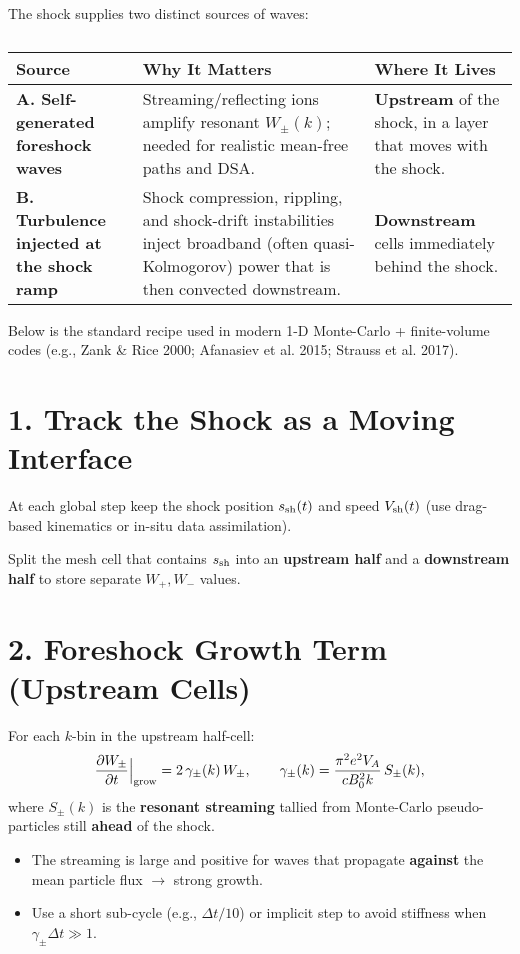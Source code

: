 The shock supplies two distinct sources of waves:

\begin{table}[h!]
\centering
\begin{tabular}{|p{5cm}|p{6.5cm}|p{4.5cm}|}
\hline
\textbf{Source} & \textbf{Why It Matters} & \textbf{Where It Lives} \\
\hline
\textbf{A. Self-generated foreshock waves} & Streaming/reflecting ions amplify resonant $W_\pm(k)$; needed for realistic mean-free paths and DSA. & \textbf{Upstream} of the shock, in a layer that moves with the shock. \\
\hline
\textbf{B. Turbulence injected at the shock ramp} & Shock compression, rippling, and shock-drift instabilities inject broadband (often quasi-Kolmogorov) power that is then convected downstream. & \textbf{Downstream} cells immediately behind the shock. \\
\hline
\end{tabular}
\caption*{}
\end{table}

\noindent Below is the standard recipe used in modern 1-D Monte-Carlo + finite-volume codes (e.g., Zank \& Rice 2000; Afanasiev et al. 2015; Strauss et al. 2017).

\section*{1. Track the Shock as a Moving Interface}

At each global step keep the shock position $s_{\rm sh}(t)$ and speed $V_{\rm sh}(t)$ (use drag-based kinematics or in-situ data assimilation).

Split the mesh cell that contains $s_{\rm sh}$ into an \textbf{upstream half} and a \textbf{downstream half} to store separate $W_+, W_-$ values.

\section*{2. Foreshock Growth Term (Upstream Cells)}

For each $k$-bin in the upstream half-cell:
\[
\frac{\partial W_\pm}{\partial t}\Big|_{\rm grow}
  = 2\,\gamma_\pm(k)\,W_\pm,
\qquad
\gamma_\pm(k) = \frac{\pi^2 e^2 V_A}{c B_0^2 k}\,S_\pm(k),
\]
where $S_\pm(k)$ is the \textbf{resonant streaming} tallied from Monte-Carlo pseudo-particles still \textbf{ahead} of the shock.

\begin{itemize}
\item The streaming is large and positive for waves that propagate \textbf{against} the mean particle flux $\rightarrow$ strong growth.
\item Use a short sub-cycle (e.g., $\Delta t/10$) or implicit step to avoid stiffness when $\gamma_\pm \Delta t \gg 1$.
\end{itemize}

